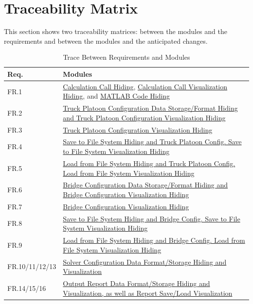 \documentclass[12pt, titlepage]{article}
\begin{document}
\section{Traceability Matrix} \label{SecTM}

This section shows two traceability matrices: between the modules and the
requirements and between the modules and the anticipated changes.

\begin{table}[H]
\centering
\begin{tabular}{p{} p{}}
\toprule
\textbf{Req.} & \textbf{Modules}\\
\midrule
FR.1 & \hyperlink{CCH}{Calculation Call Hiding}, \hyperlink{CCVH}{Calculation Call Visualization Hiding}, and \hyperlink{MCH}{MATLAB Code Hiding}\\
FR.2 & \hyperlink{TPCVH}{Truck Platoon Configuration Data Storage/Format Hiding and Truck Platoon Configuration Visualization Hiding}\\
FR.3 & \hyperlink{TPCVH}{Truck Platoon Configuration Visualization Hiding}\\
FR.4 & \hyperlink{STFSVH}{Save to File System Hiding and Truck Platoon Config. Save to File System Visualization Hiding}\\
FR.5 & \hyperlink{LFFSVH}{Load from File System Hiding and Truck Platoon Config. Load from File System Visualization Hiding}\\
FR.6 & \hyperlink{BCLFFSVH}{Bridge Configuration Data Storage/Format Hiding and Bridge Configuration Visualization Hiding}\\
FR.7 & \hyperlink{BCVH}{Bridge Configuration Visualization Hiding}\\
FR.8 & \hyperlink{FSVH}{Save to File System Hiding and Bridge Config. Save to File System Visualization Hiding}\\
FR.9 & \hyperlink{FSVH}{Load from File System Hiding and Bridge Config. Load from File System Visualization Hiding}\\
FR.10/11/12/13 & \hyperlink{SCSTFSVH}{Solver Configuration Data Format/Storage Hiding and Visualization}\\
FR.14/15/16 & \hyperlink{ORSTFSVH}{Output Report Data Format/Storage Hiding and Visualization, as well as Report Save/Load Visualization}\\
\bottomrule
\end{tabular}
\caption{Trace Between Requirements and Modules}
\label{TblRT}
\end{table}
\end{document}
